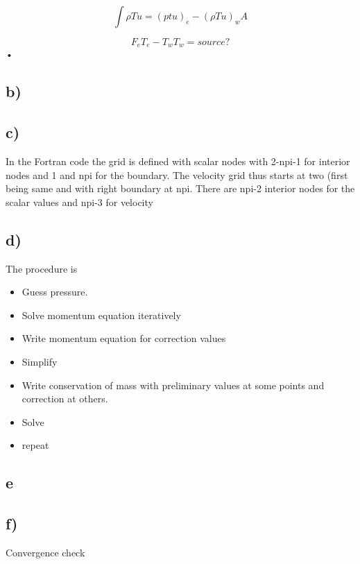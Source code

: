 \documentclass{article}
\begin{document}
\begin{equation}
\int \rho T u = (ptu)_e - (\rho T u)_w A
\end{equation}

\begin{equation}
F_eT_e - T_w T_w = source?
\end{equation}•



\subsection{b)}

\subsection{c)}

In the Fortran code the grid is defined with scalar nodes with 2-npi-1 for interior nodes and 1 and npi for the boundary. The velocity grid thus starts at two (first being same and with right boundary at npi. There are npi-2 interior nodes for the scalar values and npi-3 for velocity

\subsection{d)}

The procedure is 
\begin{itemize}
\item Guess pressure.
\item Solve momentum equation iteratively
\item Write momentum equation for correction values
\item Simplify
\item Write conservation of mass with preliminary values at some points and correction at others.
\item Solve
\item repeat

\end{itemize}

\subsection{e}

\subsection{f)}
Convergence check
\end{document}
